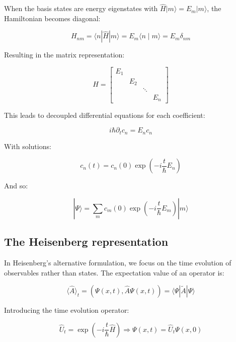 \documentclass[italian]{HKNdocument}
\begin{document}
When the basis states are energy eigenstates with $\hat{H}|m\rangle=E_{m}|m\rangle$, the Hamiltonian becomes diagonal:

\begin{equation}
H_{n m}=\langle n| \hat{H}|m\rangle=E_{m}\langle n \mid m\rangle=E_{m} \delta_{n m} \label{eq:10.23}
\end{equation}

Resulting in the matrix representation:

\[
H=\left[\begin{array}{llll}
E_{1} & & &  \label{eq:10.24}\\
& E_{2} & & \\
& & \ddots & \\
& & & E_{n}
\end{array}\right]
\]

This leads to decoupled differential equations for each coefficient:

\begin{equation}
i \hbar \partial_{t} c_{n}=E_{n} c_{n} \label{eq:10.25}
\end{equation}

With solutions:

\begin{equation}
c_{n}(t)=c_{n}(0) \exp \left(-i \frac{t}{\hbar} E_{n}\right) \label{eq:10.26}
\end{equation}


And so:

\begin{equation}
|\Psi\rangle=\sum_{m} c_{m}(0) \exp \left(-i \frac{t}{\hbar} E_{m}\right)|m\rangle \label{eq:10.27}
\end{equation}

\subsection{The Heisenberg representation}
In Heisenberg's alternative formulation, we focus on the time evolution of observables rather than states. The expectation value of an operator is:

\begin{equation}
\langle\hat{A}\rangle_{t}=(\Psi(x, t), \hat{A} \Psi(x, t))=\langle\Psi| \tilde{A}|\Psi\rangle \label{eq:10.28}
\end{equation}

Introducing the time evolution operator:

\begin{equation}
\hat{U}_{t}=\exp \left(-i \frac{t}{\hbar} \hat{H}\right) \Longrightarrow \Psi(x, t)=\hat{U}_{t} \Psi(x, 0) \label{eq:10.29}
\end{equation}
\end{document}
